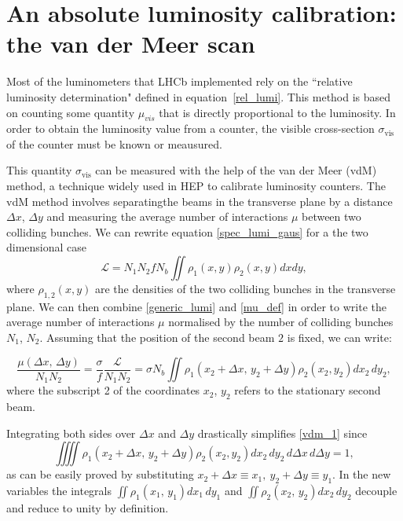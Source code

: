 \section{An absolute luminosity calibration: the van der Meer scan}
Most of the luminometers that LHCb implemented rely on the ``relative luminosity determination" defined in equation~\eqref{rel_lumi}. This method is based on counting some quantity $\mu_{vis}$ that is directly proportional to the luminosity. In order to obtain the luminosity value from a counter, the visible cross-section $\sigma_{\text{vis}}$ of the counter must be known or meausured.

This quantity $\sigma_{\text{vis}}$ can be measured with the help of the van der Meer (vdM) method, a technique widely used in HEP to calibrate luminosity counters. The vdM method involves separatingthe beams in the transverse plane by a distance $\Delta x$, $\Delta y$ and measuring the average number of interactions $\mu$ between two colliding bunches. 
We can rewrite equation \eqref{spec_lumi_gaus} for a the two dimensional case
\begin{equation}
    \mathcal{L} = N_1 N_2 f N_b\iint \rho_1(x,y) \rho_2(x,y) dxdy,\label{generic_lumi}
\end{equation}
where $\rho_{1,2}(x,y)$ are the densities of the two colliding bunches in the transverse plane.
We can then combine \eqref{generic_lumi} and \eqref{mu_def} in order to write the average number of interactions $\mu$ normalised by the number of colliding bunches $N_1$, $N_2$. Assuming that the position of the second beam $2$ is fixed, we can write:

\begin{equation}
\frac{\mu (\Delta x,\, \Delta y)}{N_1N_2} = \frac{\sigma}{f} \frac{\mathcal{L}}{N_1N_2} = \sigma N_b \iint \rho _1(x_2 + \Delta x,\, y_2 + \Delta y) \rho _2(x_2,y_2) dx_2\, dy_2, \label{vdm_1}
\end{equation}
where the subscript 2 of the coordinates $x_2$, $y_2$ refers to the stationary second beam.

Integrating both sides over $\Delta x$ and $\Delta y$ drastically simplifies \eqref{vdm_1} since
\begin{equation} \iiiint \rho _1(x_2 {+} \Delta x,\, y_2 {+} \Delta y) \rho _2(x_2,y_2) dx_2\, dy_2\, d\Delta x\, d\Delta y {=} 1, \label{vdm_2} \end{equation}
as can be easily proved by substituting $x_2+\Delta x\equiv x_1,\ y_2+\Delta y\equiv y_1$. In the new variables the integrals $\iint \rho _1(x_1,\, y_1)dx_1\,dy_1$ and $\iint \rho _2(x_2,\, y_2)dx_2\,dy_2$ decouple and reduce to unity by definition.

